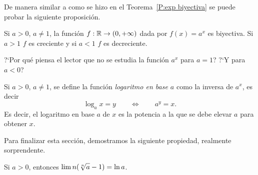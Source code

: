 De manera similar a como se hizo en el Teorema~\ref{P:exp biyectiva} se puede probar la siguiente proposición.

\begin{proposition}
    Si $a>0$, $a\neq 1$, la función $f:\mathbb{R} \to (0,+\infty)$ dada por $f(x) = a^x$ es biyectiva. Si $a>1$ $f$ es creciente y si $a<1$ $f$ es decreciente.
\end{proposition}

?`Por qué piensa el lector que no se estudia la función $a^x$ para $a=1$? ?`Y para $a<0$?

\begin{definition}
    Si $a>0$, $a\neq 1$, se define la función \emph{logaritmo en base $a$} como la inversa de $a^x$, es decir
    \[
    \log_a x = y \qquad\iff\qquad a^y = x.
    \]
    Es decir, el logaritmo en base $a$ de $x$ es la potencia a la que se debe elevar $a$ para obtener $x$.
\end{definition}

Para finalizar esta sección, demostramos la siguiente propiedad, realmente sorprendente.

\begin{proposition}
    Si $a>0$, entonces $\displaystyle \lim n (\sqrt[n]{a}-1) = \ln a$.
\end{proposition}

